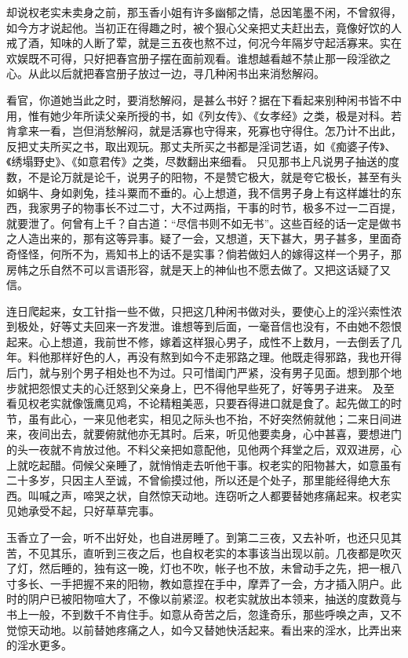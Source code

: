 \documentclass[a4paper,12pt,UTF8,twoside]{ctexbook}
\begin{document}
却说权老实未卖身之前，那玉香小姐有许多幽郁之情，总因笔墨不闲，不曾叙得，如今方才说起他。当初正在得趣之时，被个狠心父亲把丈夫赶出去，竟像好饮的人戒了酒，知味的人断了荤，就是三五夜也熬不过，何况今年隔岁守起活寡来。实在欢娱既不可得，只好把春宫册子摆在面前观看。谁想越看越不禁止那一段淫欲之心。从此以后就把春宫册子放过一边，寻几种闲书出来消愁解闷。

看官，你道她当此之时，要消愁解闷，是甚么书好？据在下看起来别种闲书皆不中用，惟有她少年所读父亲所授的书，如《列女传》、《女孝经》之类，极是对科。若肯拿来一看，岂但消愁解闷，就是活寡也守得来，死寡也守得住。怎乃计不出此，反把丈夫所买之书，取出观玩。那丈夫所买之书都是淫词艺语，如《痴婆子传》、《绣塌野史》、《如意君传》之类，尽数翻出来细看。 只见那书上凡说男子抽送的度数，不是论万就是论千，说男子的阳物，不是赞它极大，就是夸它极长，甚至有头如蜗牛、身如剥兔，挂斗粟而不垂的。心上想道，我不信男子身上有这样雄壮的东西，我家男子的物事长不过二寸，大不过两指，干事的时节，极多不过一二百提，就要泄了。何曾有上千？自古道：“尽信书则不如无书”。这些百经的话一定是做书之人造出来的，那有这等异事。疑了一会，又想道，天下甚大，男子甚多，里面奇奇怪怪，何所不为，焉知书上的话不是实事？倘若做妇人的嫁得这样一个男子，那房帏之乐自然不可以言语形容，就是天上的神仙也不愿去做了。又把这话疑了又信。

连日爬起来，女工针指一些不做，只把这几种闲书做对头，要使心上的淫兴索性浓到极处，好等丈夫回来一齐发泄。谁想等到后面，一毫音信也没有，不由她不怨恨起来。心上想道，我前世不修，嫁着这样狠心男子，成性不上数月，一去倒丢了几年。料他那样好色的人，再没有熬到如今不走邪路之理。他既走得邪路，我也开得后门，就与别个男子相处也不为过。只可惜闺门严紧，没有男子见面。想到那个地步就把怨恨丈夫的心迁怒到父亲身上，巴不得他早些死了，好等男子进来。 及至看见权老实就像饿鹰见鸡，不论精粗美恶，只要吞得进口就是食了。起先做工的时节，虽有此心，一来见他老实，相见之际头也不抬，不好突然俯就他；二来日间进来，夜间出去，就要俯就他亦无其时。后来，听见他要卖身，心中甚喜，要想进门的头一夜就不肯放过他。不料父亲把如意配他，见他两个拜堂之后，双双进房，心上就吃起醋。伺候父亲睡了，就悄悄走去听他干事。权老实的阳物甚大，如意虽有二十多岁，只因主人至诚，不曾偷摸过他，所以还是个处子，那里能经得绝大东西。叫喊之声，啼哭之状，自然惊天动地。连窃听之人都要替她疼痛起来。权老实见她承受不起，只好草草完事。

玉香立了一会，听不出好处，也自进房睡了。到第二三夜，又去补听，也还只见其苦，不见其乐，直听到三夜之后，也自权老实的本事该当出现以前。几夜都是吹灭了灯，然后睡的，独有这一晚，灯也不吹，帐子也不放，未曾动手之先，把一根八寸多长、一手把握不来的阳物，教如意捏在手中，摩弄了一会，方才插入阴户。此时的阴户已被阳物喧大了，不像以前紧涩。权老实就放出本领来，抽送的度数竟与书上一般，不到数千不肯住手。如意从奇苦之后，忽逢奇乐，那些呼唤之声，又不觉惊天动地。以前替她疼痛之人，如今又替她快活起来。看出来的淫水，比弄出来的淫水更多。
\end{document}
